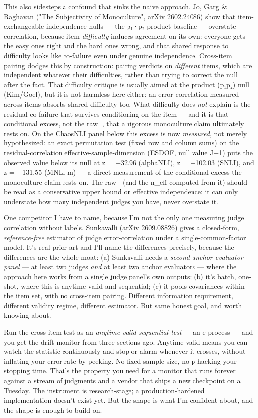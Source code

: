 \documentclass[11pt]{article}
\begin{document}
This also sidesteps a confound that sinks the naive approach. Jo, Garg \& Raghavan ("The Subjectivity of Monoculture", arXiv 2602.24086) show that item-exchangeable independence nulls — the p₁·p₂ product baseline — overstate correlation, because item \emph{difficulty} induces agreement on its own: everyone gets the easy ones right and the hard ones wrong, and that shared response to difficulty looks like co-failure even under genuine independence. Cross-item pairing dodges this by construction: pairing verdicts on \emph{different} items, which are independent whatever their difficulties, rather than trying to correct the null after the fact. That difficulty critique is usually aimed at the product (p₁p₂) null (Kim/Goel), but it is not harmless here either: an error correlation measured across items absorbs shared difficulty too. What difficulty does \emph{not} explain is the residual co-failure that survives conditioning on the item — and it is that conditional excess, not the raw , that a rigorous monoculture claim ultimately rests on. On the ChaosNLI panel below this excess is now \emph{measured}, not merely hypothesized: an exact permutation test (fixed row and column sums) on the residual-correlation effective-sample-dimension (ESDOF, null value J−1) puts the observed value below its null at z = −32.96 (alphaNLI), z = −102.03 (SNLI), and z = −131.55 (MNLI-m) — a direct measurement of the conditional excess the monoculture claim rests on. The raw  (and the n\_eff computed from it) should be read as a conservative upper bound on effective independence: it can only understate how many independent judges you have, never overstate it.

One competitor I have to name, because I'm not the only one measuring judge correlation without labels. Sunkavalli (arXiv 2609.08826) gives a closed-form, \emph{reference-free} estimator of judge error-correlation under a single-common-factor model. It's real prior art and I'll name the differences precisely, because the differences are the whole moat: (a) Sunkavalli needs a \emph{second anchor-evaluator panel} — at least two judges \emph{and} at least two anchor evaluators — where the approach here works from a single judge panel's own outputs; (b) it's batch, one-shot, where this is anytime-valid and sequential; (c) it pools covariances within the item set, with no cross-item pairing. Different information requirement, different validity regime, different estimator. But same honest goal, and worth knowing about.

Run the cross-item test as an \emph{anytime-valid sequential test} — an e-process — and you get the drift monitor from three sections ago. Anytime-valid means you can watch the statistic continuously and stop or alarm whenever it crosses, without inflating your error rate by peeking. No fixed sample size, no p-hacking your stopping time. That's the property you need for a monitor that runs forever against a stream of judgments and a vendor that ships a new checkpoint on a Tuesday. The instrument is research-stage; a production-hardened implementation doesn't exist yet. But the shape is what I'm confident about, and the shape is enough to build on.
\end{document}
